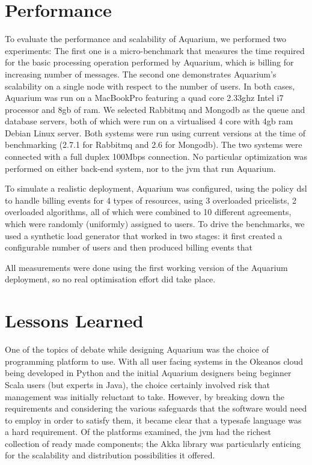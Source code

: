 \documentclass[preprint,10pt]{sigplanconf}
\begin{document}
\section{Performance}

To evaluate the performance and scalability of Aquarium, we performed two
experiments: The first one is a micro-benchmark that measures the time required
for the basic processing operation performed by Aquarium, which is billing for
increasing number of messages. The second one demonstrates Aquarium's
scalability on a single node with respect to the number of users.  In both
cases, Aquarium was run on a MacBookPro featuring a quad core 2.33{\sc g}hz
Intel i7 processor and 8{\sc gb} of {\sc ram}. We selected Rabbit{\sc mq} and
Mongo{\sc db} as the queue and database servers, both of which were run on a
virtualised 4 core with 4{\sc gb} {\sc ram} Debian Linux server. Both systems
were run using current versions at the time of benchmarking (2.7.1 for
Rabbit{\sc mq} and 2.6 for Mongo{\sc db}).  The two systems were connected with
a full duplex 100Mbps connection.  No particular optimization was performed on
either back-end system, nor to the {\sc jvm} that run Aquarium. 

To simulate a realistic deployment, Aquarium was configured, using the policy
{\sc dsl} to handle billing events for 4 types of resources, using 3 overloaded
pricelists, 2 overloaded algorithms, all of which were combined to 10 different
agreements, which were randomly (uniformly) assigned to users. To drive the
benchmarks, we used a synthetic load generator that worked in two stages: it
first created a configurable number of users and then produced billing events
that 


All measurements were done using the first working version of the
Aquarium deployment, so no real optimisation effort did take place. 


\section{Lessons Learned}

One of the topics of debate while designing Aquarium was the choice of
programming platform to use. With all user facing systems in the Okeanos cloud
being developed in Python and the initial Aquarium designers being beginner
Scala users (but experts in Java), the choice certainly involved risk that
management was initially reluctant to take. However, by breaking down the
requirements and considering the various safeguards that the software would
need to employ in order to satisfy them, it became clear that a
typesafe language was a hard requirement. Of the platforms examined, the {\sc
jvm} had the richest collection of ready made components; the Akka library was
particularly enticing for the scalability and distribution possibilities it
offered.
\end{document}

